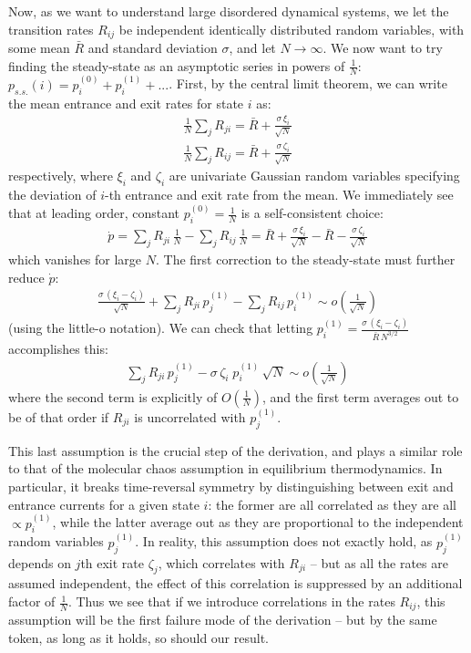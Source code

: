 \documentclass[reprint,prx]{revtex4-1}
\renewcommand{\=}[1]{\stackrel{#1}{=}} %
\renewcommand{\(}{\left (}
\renewcommand{\)}{\right  )}
\renewcommand{\[}{\left [}
\renewcommand{\]}{\right ]}
\newcommand{\<}{\left <}
\renewcommand{\>}{\right >}
\theoremstyle{definition}
\theoremstyle{remark}
\newcommand{\bigO}[1]{O\(#1\)}  %
\begin{document}
Now, as we want to understand large disordered dynamical systems, we let the transition rates $ R_{ij} $ be independent identically distributed random variables, with some mean $ \bar{R} $ and standard deviation $ \sigma $, and let $ N \rightarrow \infty$. We now want to try finding the steady-state as an asymptotic series in powers of $ \frac{1}{N} $: $ p_{s.s.}(i) = p^{(0)}_i + p^{(1)}_i +... $. First, by the central limit theorem, we can write the mean entrance and exit rates for state $ i $ as:
\begin{align*}
\frac{1}{N} \sum_j R_{ji} = \bar{R} + \frac{\sigma\, \xi_i}{\sqrt{N}}\\
 \frac{1}{N} \sum_j R_{ij} = \bar{R} + \frac{\sigma\, \zeta_i}{\sqrt{N}}
\end{align*}
respectively, where $ \xi_i $ and $ \zeta_i $ are univariate Gaussian random variables specifying the deviation of $ i $-th entrance and exit rate from the mean. We immediately see that at leading order, constant $ p^{(0)}_i =\frac{1}{N} $ is a self-consistent choice:
\begin{align*}
\dot{p} = \sum_j R_{ji}\, \frac{1}{N} - \sum_j R_{ij}\, \frac{1}{N} =  \bar{R} + \frac{\sigma\, \xi_i}{\sqrt{N}} - \bar{R} - \frac{\sigma\, \zeta_i}{\sqrt{N}}
\end{align*}
which vanishes for large $ N $. The first correction to the steady-state must further reduce $ \dot{p} $:
\begin{align*}
\frac{\sigma\, (\xi_i-\zeta_i)}{\sqrt{N}} +\sum_j R_{ji}\, p^{(1)}_j - \sum_j R_{ij}\, p^{(1)}_i \sim o\(\frac{1}{\sqrt{N}}\)
\end{align*}
(using the little-o notation). We can check that letting $ p^{(1)}_i =  \frac{\sigma\, (\xi_i-\zeta_i)}{\bar{R}\, N^{3/2}}$ accomplishes this:
\begin{align*}
\sum_j R_{ji}\, p^{(1)}_j - \sigma\, \zeta_i\; p^{(1)}_i\,\sqrt{N} \sim o\(\frac{1}{\sqrt{N}}\)
\end{align*}
where the second term is explicitly of $ \bigO{\frac{1}{N}} $, and the first term averages out to be of that order if $ R_{ji} $ is uncorrelated with $ p^{(1)}_j $. 

This last assumption is the crucial step of the derivation, and plays a similar role to that of the molecular chaos assumption in equilibrium thermodynamics. In particular, it breaks time-reversal symmetry by distinguishing between exit and entrance currents for a given state $ i $: the former are all correlated as they are all $ \propto p^{(1)}_i $, while the latter average out as they are proportional to the independent random variables $ p^{(1)}_j $. In reality, this assumption does not exactly hold, as $ p^{(1)}_j $ depends on $ j $th exit rate $ \zeta_j $, which correlates with  $ R_{ji} $ -- but as all the rates are assumed independent, the effect of this correlation is suppressed by an additional factor of $ \frac{1}{N} $. Thus we see that if we introduce correlations in the rates $ R_{ij} $, this assumption will be the first failure mode of the derivation -- but by the same token, as long as it holds, so should our result. 
\end{document}
